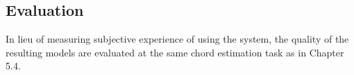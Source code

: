 \subsection{Evaluation}
\label{subsec:evaluation}

In lieu of measuring subjective experience of using the system, the quality of the resulting models are evaluated at the same chord estimation task as in Chapter 5.4.





